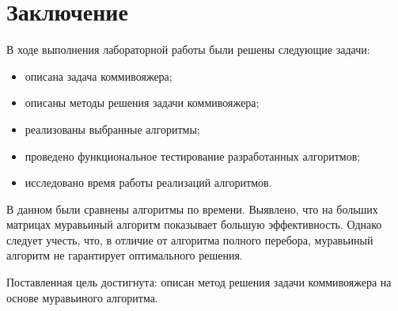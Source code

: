 \chapter*{Заключение}

В ходе выполнения лабораторной работы были решены следующие задачи:
\begin{itemize}[label=--]
	\item описана задача коммивояжера;
	\item описаны методы решения задачи коммивояжера;
	\item реализованы выбранные алгоритмы;
	\item проведено функциональное тестирование разработанных алгоритмов;
	\item исследовано время работы реализаций алгоритмов.
\end{itemize}

В данном были сравнены алгоритмы по времени. Выявлено, что на больших матрицах муравьиный алгоритм показывает большую эффективность. Однако следует учесть, что, в отличие от алгоритма полного перебора, муравьиный алгоритм не гарантирует оптимального решения.

Поставленная цель достигнута: описан метод решения задачи коммивояжера на основе муравьиного алгоритма.
